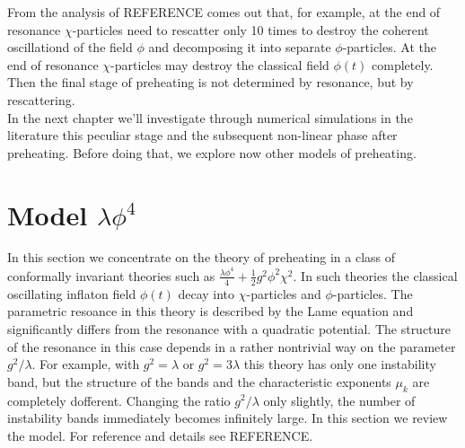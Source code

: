 \documentclass[11pt,a4paper,twoside]{book}
\begin{document}
 From the analysis of REFERENCE comes out that, for example, at the end of resonance $\chi$-particles need to rescatter only 10 times to destroy the coherent oscillationd of the field $\phi$ and decomposing it into separate $\phi$-particles. At the end of resonance $\chi$-particles may destroy the classical field $\phi(t)$ completely. Then the final stage of preheating is not determined by resonance, but by rescattering.\\
 In the next chapter we'll investigate through numerical simulations in the literature this peculiar stage and the subsequent non-linear phase after preheating. Before doing that, we explore now other models of preheating.
 
 \section{Model $\lambda \phi^{4}$}
 In this section we concentrate on the theory of preheating in a class of conformally invariant theories such as $ \frac{\lambda \phi^{4}}{4} + \frac{1}{2}g^{2}\phi^{2}\chi^{2} $. In such theories the classical oscillating inflaton field $\phi(t)$ decay into $\chi$-particles and $\phi$-particles. The parametric resoance in this theory is described by the Lame equation and significantly differs from the resonance with a quadratic potential. The structure of the resonance in this case depends in a rather nontrivial way on the parameter $ g^{2}/\lambda $. For example,  with $ g^{2}=\lambda $ or $ g^{2}=3\lambda $ this theory has only one instability band, but the structure of the bands and the characteristic exponents $\mu_{k}$ are completely dofferent. Changing the ratio $ g^{2}/\lambda $ only slightly, the number of instability bands immediately becomes infinitely large.
 In this section we review the model. For reference and details see REFERENCE.\\
\end{document}
